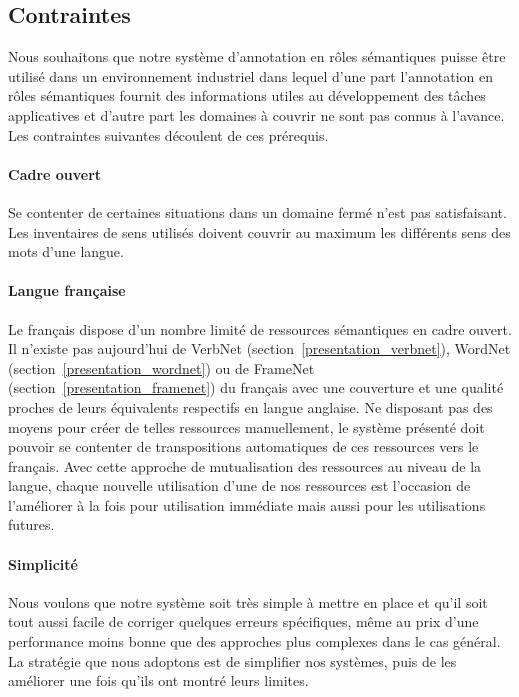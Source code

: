 \subsection{Contraintes}

Nous souhaitons que notre système d'annotation en rôles sémantiques puisse être
utilisé dans un environnement industriel dans lequel d'une part l'annotation en
rôles sémantiques fournit des informations utiles au développement des tâches
applicatives et d'autre part les domaines à couvrir ne sont pas connus à
l'avance. Les contraintes suivantes découlent de ces prérequis.

\paragraph{Cadre ouvert} Se contenter de certaines situations dans un domaine
fermé n'est pas satisfaisant. Les inventaires de sens utilisés doivent couvrir
au maximum les différents sens des mots d'une langue.

\paragraph{Langue française} Le français dispose d'un nombre limité de
ressources sémantiques en cadre ouvert. Il n'existe pas aujourd'hui de VerbNet
(section~\ref{presentation_verbnet}), WordNet
(section~\ref{presentation_wordnet}) ou de FrameNet
(section~\ref{presentation_framenet}) du français avec une couverture et une
qualité proches de leurs équivalents respectifs en langue anglaise. Ne
disposant pas des moyens pour créer de telles ressources manuellement, le
système présenté doit pouvoir se contenter de transpositions automatiques de
ces ressources vers le français. Avec cette approche de mutualisation des
ressources au niveau de la langue, chaque nouvelle utilisation d'une de nos
ressources est l'occasion de l'améliorer à la fois pour utilisation immédiate
mais aussi pour les utilisations futures.

\paragraph{Simplicité} Nous voulons que notre système soit très simple à mettre
en place et qu'il soit tout aussi facile de corriger quelques erreurs
spécifiques, même au prix d'une performance moins bonne que des approches plus
complexes dans le cas général. La stratégie que nous adoptons est de simplifier
nos systèmes, puis de les améliorer une fois qu'ils ont montré leurs limites.

